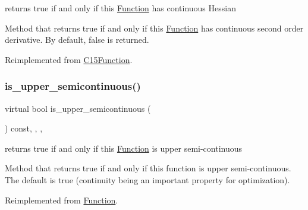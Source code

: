 returns true if and only if this \mbox{\hyperlink{class_s_m_spp__di__unipi__it_1_1_function}{Function}} has continuous Hessian 

Method that returns true if and only if this \mbox{\hyperlink{class_s_m_spp__di__unipi__it_1_1_function}{Function}} has continuous second order derivative. By default, false is returned. 

Reimplemented from \mbox{\hyperlink{class_s_m_spp__di__unipi__it_1_1_c15_function_af95feab5ca3e555525ad19786347e2ec}{C15\+Function}}.

\mbox{\label{class_s_m_spp__di__unipi__it_1_1_d_quad_function_acb905dad2242bc107ae51cab2a7f1af3}} 
\subsubsection{\texorpdfstring{is\+\_\+upper\+\_\+semicontinuous()}{is\_upper\_semicontinuous()}}
{\footnotesize\ttfamily virtual bool is\+\_\+upper\+\_\+semicontinuous (\begin{DoxyParamCaption}\item[{void}]{ }\end{DoxyParamCaption}) const\hspace{0.3cm}{\ttfamily [inline]}, {\ttfamily [final]}, {\ttfamily [override]}, {\ttfamily [virtual]}}



returns true if and only if this \mbox{\hyperlink{class_s_m_spp__di__unipi__it_1_1_function}{Function}} is upper semi-\/continuous 

Method that returns true if and only if this function is upper semi-\/continuous. The default is true (continuity being an important property for optimization). 

Reimplemented from \mbox{\hyperlink{class_s_m_spp__di__unipi__it_1_1_function_afa2086256b54e80d2dcfd11ad6adcd07}{Function}}.

\mbox{\label{class_s_m_spp__di__unipi__it_1_1_d_quad_function_aefa341ebfc281c57164e8a1027c0639f}} 
